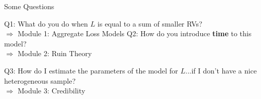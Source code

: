 \documentclass[11pt]{beamer}
\begin{document}
\begin{frame}{Some Questions}

Q1: What do you do when $L$ is equal to a sum of smaller RVs? \\
\color{red}$\Rightarrow$  Module 1: Aggregate Loss Models
\vfill
\color{black}Q2: How do you introduce \textbf{time} to this model? \\
\color{red}$\Rightarrow$  Module 2: Ruin Theory
\vfill


\color{black} Q3: How do I estimate the parameters of the model for $L$...if I don't have a nice heterogeneous sample? \\
\color{red}$\Rightarrow$  Module 3: Credibility 

\end{frame}

\end{document}
